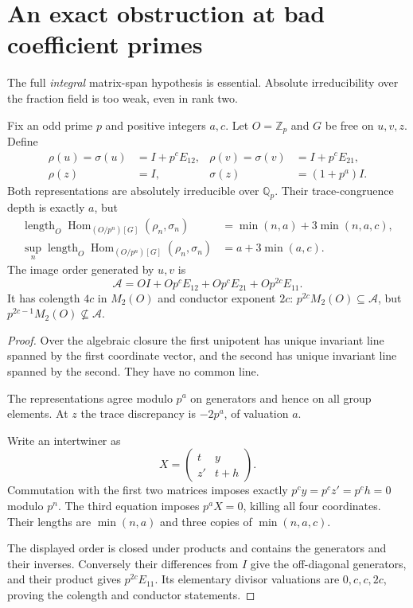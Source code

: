 \section{An exact obstruction at bad coefficient primes}
\label{sec:bad}

The full \emph{integral} matrix-span hypothesis is essential. Absolute
irreducibility over the fraction field is too weak, even in rank two.

\begin{theorem}
\label{thm:bad}
Fix an odd prime \(p\) and positive integers \(a,c\). Let \(O=\mathbb Z_p\)
and \(G\) be free on \(u,v,z\). Define
\[
 \begin{aligned}
 \rho(u)=\sigma(u)&=I+p^cE_{12},&
 \rho(v)=\sigma(v)&=I+p^cE_{21},\\
 \rho(z)&=I,& \sigma(z)&=(1+p^a)I.
 \end{aligned}
\]
Both representations are absolutely irreducible over \(\mathbb Q_p\).
Their trace-congruence depth is exactly \(a\), but
\begin{align}
 \operatorname{length}_O
 \operatorname{Hom}_{(O/p^n)[G]}(\rho_n,\sigma_n)
 &=\min(n,a)+3\min(n,a,c), \label{eq:badlength}\\
 \sup_n\operatorname{length}_O
 \operatorname{Hom}_{(O/p^n)[G]}(\rho_n,\sigma_n)
 &=a+3\min(a,c).
 \end{align}
The image order generated by \(u,v\) is
\[
 \mathcal A=OI+Op^cE_{12}+Op^cE_{21}+Op^{2c}E_{11}.
 \]
It has colength \(4c\) in \(M_2(O)\) and conductor exponent \(2c\):
\(p^{2c}M_2(O)\subseteq\mathcal A\), but
\(p^{2c-1}M_2(O)\nsubseteq\mathcal A\).
\end{theorem}

\begin{proof}
Over the algebraic closure the first unipotent has unique invariant line
spanned by the first coordinate vector, and the second has unique
invariant line spanned by the second. They have no common line.

The representations agree modulo \(p^a\) on generators and hence on
all group elements. At \(z\) the trace discrepancy is \(-2p^a\),
of valuation \(a\).

Write an intertwiner as
\[
 X=\begin{pmatrix}t&y\\z'&t+h\end{pmatrix}.
 \]
Commutation with the first two matrices imposes exactly
\(p^cy=p^cz'=p^ch=0\) modulo \(p^n\).
The third equation imposes \(p^aX=0\), killing all four coordinates.
Their lengths are \(\min(n,a)\) and three copies of \(\min(n,a,c)\).

The displayed order is closed under products and contains the generators
and their inverses. Conversely their differences from \(I\) give the
off-diagonal generators, and their product gives \(p^{2c}E_{11}\).
Its elementary divisor valuations are \(0,c,c,2c\), proving the
colength and conductor statements.
\end{proof}


